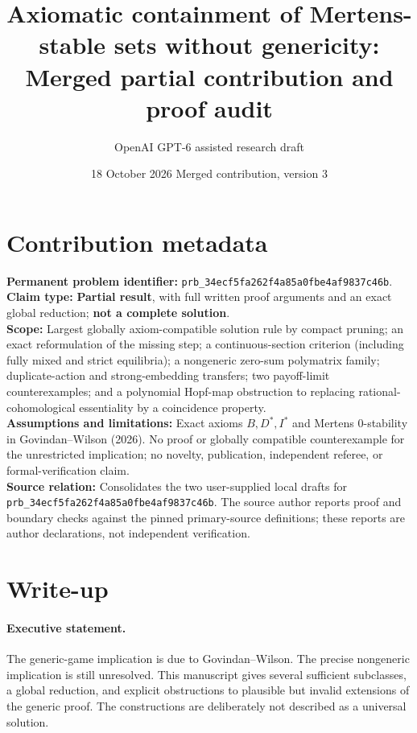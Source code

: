 \documentclass[11pt]{article}
\title{Axiomatic containment of Mertens-stable sets without genericity:\\
\large Merged partial contribution and proof audit}
\author{OpenAI GPT-6 assisted research draft}
\date{18 October 2026 \quad\textbullet\quad Merged contribution, version 3}
\theoremstyle{definition}
\begin{document}
\maketitle
\thispagestyle{plain}

\section*{Contribution metadata}
\noindent\textbf{Permanent problem identifier:} \texttt{prb\_34ecf5fa262f4a85a0fbe4af9837c46b}.\\
\textbf{Claim type:} \textbf{Partial result}, with full written proof arguments
and an exact global reduction; \textbf{not a complete solution}.\\
\textbf{Scope:} Largest globally axiom-compatible solution rule by compact
pruning; an exact reformulation of the missing step; a continuous-section
criterion (including fully mixed and strict equilibria); a nongeneric
zero-sum polymatrix family; duplicate-action and strong-embedding transfers;
two payoff-limit counterexamples; and a polynomial Hopf-map obstruction to
replacing rational-cohomological essentiality by a coincidence property.\\
\textbf{Assumptions and limitations:} Exact axioms $B,D^*,I^*$ and
Mertens $0$-stability in Govindan--Wilson (2026). No proof or globally
compatible counterexample for the unrestricted implication; no novelty,
publication, independent referee, or formal-verification claim.\\
\textbf{Source relation:} Consolidates the two user-supplied local drafts
for \texttt{prb\_34ecf5fa262f4a85a0fbe4af9837c46b}. The source author reports proof and boundary checks
against the pinned primary-source definitions; these reports are author
declarations, not independent verification.

\section{Write-up}
\paragraph{Executive statement.}
The generic-game implication is due to Govindan--Wilson. The precise
nongeneric implication is still unresolved. This manuscript gives several
sufficient subclasses, a global reduction, and explicit obstructions to
plausible but invalid extensions of the generic proof. The constructions
are deliberately not described as a universal solution.
\end{document}
